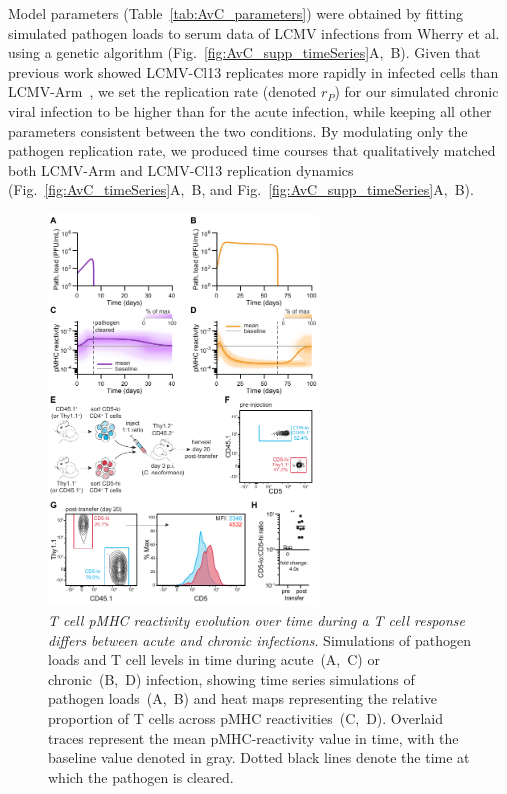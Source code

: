 Model parameters (Table~\ref{tab:AvC_parameters}) were obtained by fitting simulated pathogen loads to serum data of LCMV infections from Wherry et al.~\cite{wherry2003viral} using a genetic algorithm (Fig.~\ref{fig:AvC_supp_timeSeries}A,~B). Given that previous work showed LCMV-Cl13 replicates more rapidly in infected cells than LCMV-Arm~\cite{bergthaler2010viral}, we set the replication rate (denoted $r_P$) for our simulated chronic viral infection to be higher than for the acute infection, while keeping all other parameters consistent between the two conditions. By modulating only the pathogen replication rate, we produced time courses that qualitatively matched both LCMV-Arm and LCMV-Cl13 replication dynamics (Fig.~\ref{fig:AvC_timeSeries}A,~B, and Fig.~\ref{fig:AvC_supp_timeSeries}A,~B).
%
\begin{figure}[htb!]
    \centering
    \includegraphics[width=0.64\textwidth]{Figures/AvC/fig2_timeSeries.pdf}
    \caption[T cell pMHC reactivity evolution over time during a T cell response differs between acute and chronic infections]{%
    \textit{T cell pMHC reactivity evolution over time during a T cell response differs between acute and chronic infections}. %
     Simulations of pathogen loads and T cell levels in time during acute~(A,~C) or chronic~(B,~D) infection, showing time series simulations of pathogen loads~(A,~B) and heat maps representing the relative proportion of T cells across pMHC reactivities~(C,~D). Overlaid traces represent the mean pMHC-reactivity value in time, with the baseline value denoted in gray. Dotted black lines denote the time at which the pathogen is cleared. %
}
\end{figure}
